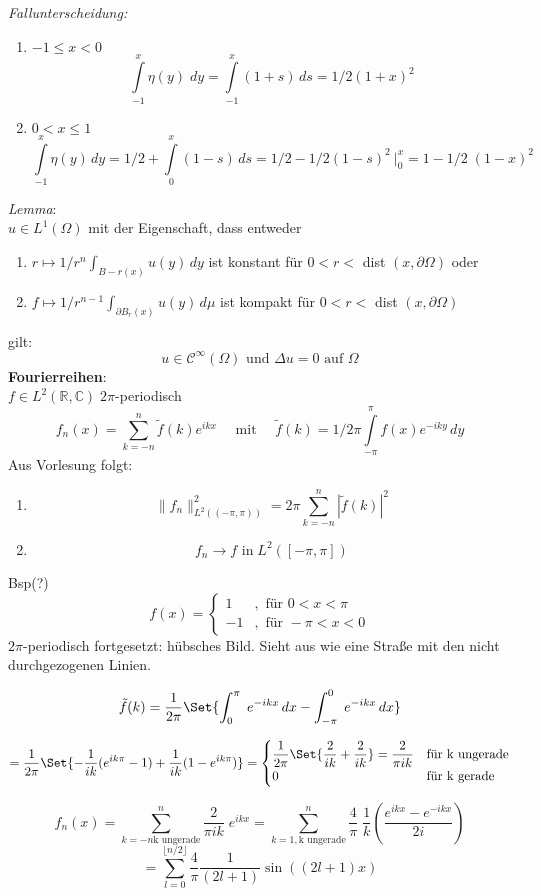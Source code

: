 \documentclass[11pt]{memoir}
\newcommand{\dom}{\partial\Omega}
\begin{document}
\emph{Fallunterscheidung:}
\begin{enumerate}
	\item $-1 \leq x < 0$		
	$$\int\limits_{-1}^x \eta (y) \;dy = \int\limits_{-1}^x (1+s) \, ds = 1/2 (1+x)^2$$
	\item $0 < x \leq 1$
	$$\int\limits_{-1}^x \eta(y) \, dy = 1/2 + \int\limits_0^x (1-s) \, ds = 1/2 - 1/2 (1 - s)^2 \ \bigg\vert ^x_0 = 1 - 1/2\;(1-x)^2$$
\end{enumerate}
\emph{Lemma}: \\
$u \in L^1(\Omega)$ mit der Eigenschaft, dass entweder
\begin{enumerate}
	\item $ r \mapsto 1/r^n \int_{B-r(x)} u(y) \, dy$ ist konstant für $0 < r <  $ dist $(x, \dom)$ oder
	\item $f \mapsto 1/r^{n-1} \int_{\partial B_r(x)} u(y) \, d\mu$ ist kompakt für $0 < r <  $ dist $(x, \dom)$
\end{enumerate}
gilt:
$$u \in \mathscr C^\infty(\Omega) \text{ und }\Delta u = 0 \text{ auf  }\Omega$$
\textbf{Fourierreihen}: \\
$f \in L^2(\mathbb R, \mathbb C) \;2\pi$-periodisch 
$$f_n(x) = \sum\limits_{k=-n}^n \tilde{f}(k) e^{ikx} \quad \text{ mit } \quad \tilde{f}(k) = 1/2\pi \int\limits_{-\pi}^\pi f(x) e^{-iky} \, dy$$
Aus Vorlesung folgt:
\begin{enumerate}
	\item $$\|f_n\|^2_{L^2((-\pi, \pi))} = 2\pi \sum\limits_{k=-n}^n |\tilde{f}(k)|^2$$ 
	\item $$f_n \rightarrow f \text{ in} \;L^2([-\pi, \pi])$$
\end{enumerate}

Bsp(?)
\begin{equation}
	f(x) = 
	\begin{cases}
		1 & , \text{ für }0 < x < \pi \\
		-1 & , \text{ für } -\pi < x < 0
	\end{cases}
\end{equation}
$2\pi$-periodisch fortgesetzt: hübsches Bild. Sieht aus wie eine Straße mit den nicht durchgezogenen Linien. \\
\par

$$\tilde{f}(k) = \dfrac{1}{2\pi} \Set{\int_0^\pi \;e^{-ikx} \, dx - \int^0_{-\pi}\; e^{-ikx} \, dx}$$
\par
\begin{equation}
	= \dfrac{1}{2\pi} \Set{-\dfrac{1}{ik}(e^{ik\pi} - 1) + \dfrac{1}{ik}(1- e^{ik\pi})} =
	\begin{cases}
		\dfrac{1}{2\pi} \Set{\dfrac{2}{ik} + \dfrac{2}{ik}} = \dfrac{2}{\pi ik} & \text{für k ungerade} \\
		0 & \text{für k gerade}
	\end{cases}
\end{equation}


$$f_n(x) = \sum\limits_{k=-n\text{k ungerade}}^n \dfrac{2}{\pi i k} \;e^{ikx} = \sum\limits_{k=1, \text{k ungerade}}^n \dfrac{4}{\pi} \;\dfrac{1}{k} \left(\dfrac{e^{ikx} - e^{-ikx}}{2i}\right) $$
$$= \sum\limits_{l=0}^{\lfloor n/2 \rfloor} \dfrac{4}{\pi} \dfrac{1}{(2l+1)}\sin((2l+1)x) $$
 
\end{document}
